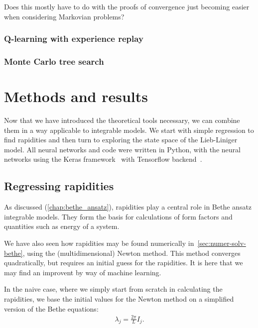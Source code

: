 \documentclass[11pt, a4paper]{report} %
\begin{document}
Does this mostly have to do with the proofs of convergence just becoming easier when considering Markovian problems?

\subsection{Q-learning with experience replay}

\subsection{Monte Carlo tree search}






\chapter{Methods and results}\label{chap:results}

Now that we have introduced the theoretical tools necessary, we can combine them in a way applicable to integrable models.
We start with simple regression to find rapidities and then turn to exploring the state space of the Lieb-Liniger model.
All neural networks and code were written in Python, with the neural networks using the Keras framework~\cite{chollet2015keras} with Tensorflow backend~\cite{tensorflow2015-whitepaper}.

\section{Regressing rapidities}

As discussed (\cref{chap:bethe_ansatz}), rapidities play a central role in Bethe ansatz integrable models.
They form the basis for calculations of form factors and quantities such as energy of a system.

We have also seen how rapidities may be found numerically in~\cref{sec:numer-solv-bethe}, using the (multidimensional) Newton method.
This method converges quadratically, but requires an initial guess for the rapidities.
It is here that we may find an improvent by way of machine learning.

In the naive case, where we simply start from scratch in calculating the rapidities, we base the initial values for the Newton method on a simplified version of the Bethe equations:
\begin{align}
  \label{eq:12}
  \lambda_j = \frac{2\pi}{L} I_j.
\end{align}
\end{document}
